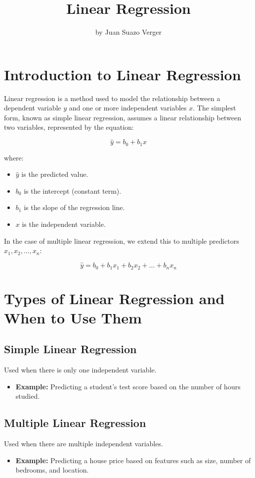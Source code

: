 \documentclass{article}
\title{Linear Regression}
\author{by Juan Suazo Verger}
\date{}
\begin{document}
\maketitle

\newpage
\section{Introduction to Linear Regression}

Linear regression is a method used to model the relationship between a dependent variable \(y\) and one or more independent variables \(x\). The simplest form, known as simple linear regression, assumes a linear relationship between two variables, represented by the equation:

\[
\hat{y} = b_0 + b_1 x
\]

where:
\begin{itemize}
    \item \(\hat{y}\) is the predicted value.
    \item \(b_0\) is the intercept (constant term).
    \item \(b_1\) is the slope of the regression line.
    \item \(x\) is the independent variable.
\end{itemize}

In the case of multiple linear regression, we extend this to multiple predictors \(x_1, x_2, \dots, x_n\):

\[
\hat{y} = b_0 + b_1 x_1 + b_2 x_2 + \dots + b_n x_n
\]

\newpage
\section{Types of Linear Regression and When to Use Them}

\subsection{Simple Linear Regression}
Used when there is only one independent variable. 
\begin{itemize}
    \item \textbf{Example:} Predicting a student's test score based on the number of hours studied.
\end{itemize}

\subsection{Multiple Linear Regression}
Used when there are multiple independent variables.
\begin{itemize}
    \item \textbf{Example:} Predicting a house price based on features such as size, number of bedrooms, and location.
\end{itemize}
\end{document}
